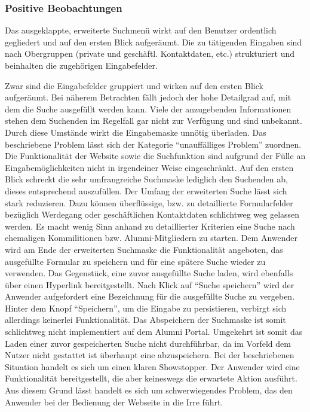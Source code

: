
\subsubsection*{Positive Beobachtungen}
Das ausgeklappte, erweiterte Suchmenü wirkt auf den Benutzer ordentlich gegliedert und auf den ersten Blick aufgeräumt. Die zu tätigenden Eingaben sind nach Obergruppen (private und geschäftl. Kontaktdaten, etc.) strukturiert und beinhalten die zugehörigen Eingabefelder.

{
	Zwar sind die Eingabefelder gruppiert und wirken auf den ersten Blick aufgeräumt. Bei näherem Betrachten fällt jedoch der hohe Detailgrad auf, mit dem die Suche ausgefüllt werden kann. Viele der anzugebenden Informationen stehen dem Suchenden im Regelfall gar nicht zur Verfügung und sind unbekannt. Durch diese Umstände wirkt die Eingabemaske unnötig überladen.
}
{
	Das beschriebene Problem lässt sich der Kategorie “unauffälliges Problem” zuordnen. Die Funktionalität der Website sowie die Suchfunktion sind aufgrund der Fülle an Eingabemöglichkeiten nicht in irgendeiner Weise eingeschränkt. Auf den ersten Blick schreckt die sehr umfrangreiche Suchmaske lediglich den Suchenden ab, dieses entsprechend auszufüllen.
}
{
	Der Umfang der erweiterten Suche lässt sich stark reduzieren. Dazu können überflüssige, bzw. zu detaillierte Formularfelder bezüglich Werdegang oder geschäftlichen Kontaktdaten schlichtweg weg gelassen werden. Es macht wenig Sinn anhand zu detaillierter Kriterien eine Suche nach ehemaligen Kommilitionen bzw. Alumni-Mitgliedern zu starten.
}
{
	Dem Anwender wird am Ende der erweiterten Suchmaske die Funktionalität angeboten, das ausgefüllte Formular zu speichern und für eine spätere Suche wieder zu verwenden. Das Gegenstück, eine zuvor ausgefüllte Suche laden, wird ebenfalls über einen Hyperlink bereitgestellt. Nach Klick auf “Suche speichern” wird der Anwender aufgefordert eine Bezeichnung für die ausgefüllte Suche zu vergeben. Hinter dem Knopf “Speichern”, um die Eingabe zu persistieren, verbirgt sich allerdings keinerlei Funktionalität. Das Abspeichern der Suchmaske ist somit schlichtweg nicht implementiert auf dem Alumni Portal. Umgekehrt ist somit das Laden einer zuvor gespeicherten Suche nicht durchführbar, da im Vorfeld dem Nutzer nicht gestattet ist überhaupt eine abzuspeichern.
}
{
	Bei der beschriebenen Situation handelt es sich um einen klaren Showstopper. Der Anwender wird eine Funktionalität bereitgestellt, die aber keineswegs die erwartete Aktion ausführt. Aus diesem Grund lässt handelt es sich um schwerwiegendes Problem, das den Anwender bei der Bedienung der Webseite in die Irre führt.
}
